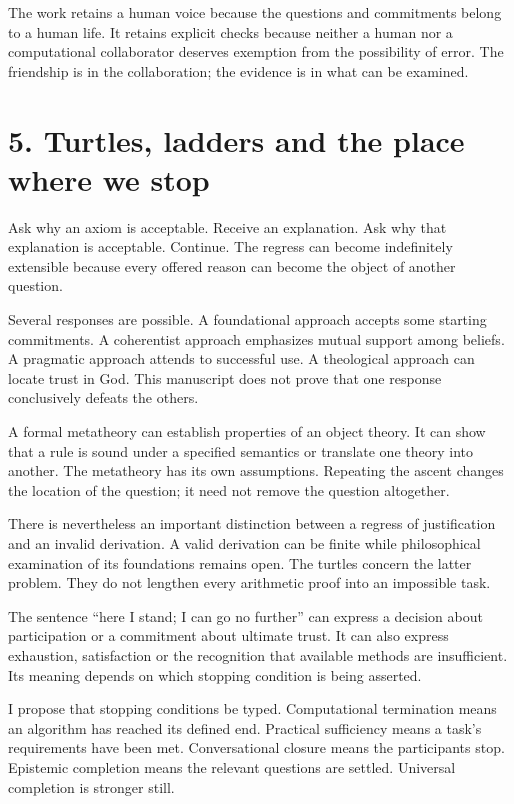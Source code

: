 \documentclass[10pt]{article}
\begin{document}
The work retains a human voice because the questions and commitments belong to a human life. It retains explicit checks because neither a human nor a computational collaborator deserves exemption from the possibility of error. The friendship is in the collaboration; the evidence is in what can be examined.

\clearpage
\section*{5. Turtles, ladders and the place where we stop}
Ask why an axiom is acceptable. Receive an explanation. Ask why that explanation is acceptable. Continue. The regress can become indefinitely extensible because every offered reason can become the object of another question.

Several responses are possible. A foundational approach accepts some starting commitments. A coherentist approach emphasizes mutual support among beliefs. A pragmatic approach attends to successful use. A theological approach can locate trust in God. This manuscript does not prove that one response conclusively defeats the others.

A formal metatheory can establish properties of an object theory. It can show that a rule is sound under a specified semantics or translate one theory into another. The metatheory has its own assumptions. Repeating the ascent changes the location of the question; it need not remove the question altogether.

There is nevertheless an important distinction between a regress of justification and an invalid derivation. A valid derivation can be finite while philosophical examination of its foundations remains open. The turtles concern the latter problem. They do not lengthen every arithmetic proof into an impossible task.

The sentence ``here I stand; I can go no further'' can express a decision about participation or a commitment about ultimate trust. It can also express exhaustion, satisfaction or the recognition that available methods are insufficient. Its meaning depends on which stopping condition is being asserted.

I propose that stopping conditions be typed. Computational termination means an algorithm has reached its defined end. Practical sufficiency means a task's requirements have been met. Conversational closure means the participants stop. Epistemic completion means the relevant questions are settled. Universal completion is stronger still.
\end{document}
